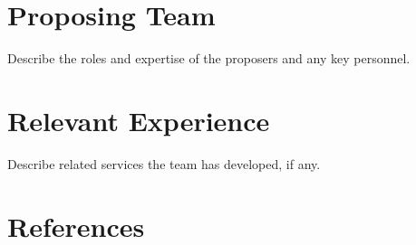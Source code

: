 \documentclass[11pt, letterpaper]{article}
\begin{document}
\section{Proposing Team}

Describe the roles and expertise of the proposers and any key personnel.

\section{Relevant Experience}

Describe related services the team has developed, if any.





\section{References}
\end{document}
